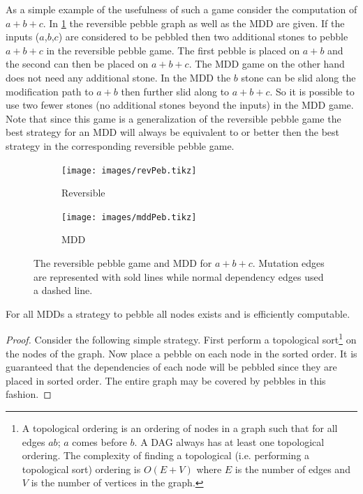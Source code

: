 As a simple example of the usefulness of such a game consider the computation
of $a+b+c$. In \cref{fig:mddExample} the reversible pebble graph as well as the
MDD are given. If the inputs ($a$,$b$,$c$) are considered to be pebbled then
two additional stones to pebble $a+b+c$ in the reversible pebble game. The
first pebble is placed on $a+b$ and the second can then be placed on $a+b+c$.
The MDD game on the other hand does not need any additional stone. In the MDD
the $b$ stone can be slid along the modification path to $a+b$ then further
slid along to $a+b+c$. So it is possible to use two fewer stones (no additional
stones beyond the inputs) in the MDD game. Note that since this game is a
generalization of the reversible pebble game the best strategy for an MDD will
always be equivalent to or better then the best strategy in the corresponding
reversible pebble game.

\begin{figure}
  \centering
  \begin{subfigure}{0.3\textwidth}
    \texttt{[image: images/revPeb.tikz]}
    \caption{Reversible}
  \end{subfigure}
  \qquad\qquad
  \begin{subfigure}{0.3\textwidth}
    \texttt{[image: images/mddPeb.tikz]}
    \caption{MDD}
  \end{subfigure}
  \label{fig:mddExample}
  \caption{The reversible pebble game and MDD for $a+b+c$. Mutation edges are
  represented with sold lines while normal dependency edges used a dashed line.}
\end{figure}

\begin{theorem} For all MDDs a strategy to pebble all nodes exists and is
efficiently computable. \end{theorem}

\begin{proof} Consider the following simple strategy. First perform a
topological sort\footnote{A topological ordering is an ordering of nodes in
a graph such that for all edges $ab$; $a$ comes before $b$. A DAG
always has at least one topological ordering. The complexity of finding
a topological (i.e. performing a topological sort) ordering is $O(E+V)$
where $E$ is the number of edges and $V$ is the number of vertices in the
graph.} on the nodes of the graph. Now place a pebble on each node in the
sorted order. It is guaranteed that the dependencies of each node will be
pebbled since they are placed in sorted order. The entire graph may be covered
by pebbles in this fashion.\end{proof}

